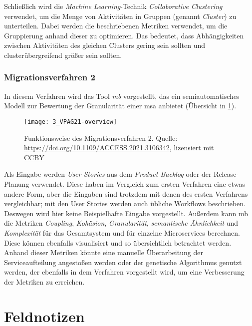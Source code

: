 Schließlich wird die \emph{Machine Learning}-Technik \emph{Collaborative Clustering} verwendet, um die Menge von Aktivitäten in Gruppen (genannt \emph{Cluster}) zu unterteilen.
Dabei werden die beschriebenen Metriken verwendet, um die Gruppierung anhand dieser zu optimieren.
Das bedeutet, dass Abhängigkeiten zwischen Aktivitäten des gleichen Clusters gering sein sollten und clusterübergreifend größer sein sollten.

\subsection{Migrationsverfahren 2}

In diesem Verfahren wird das Tool \emph{\acrfull{mb}} vorgestellt, das ein semiautomatisches Modell zur Bewertung der Granularität einer \gls{msa} anbietet (Übersicht in \cref{fig:interviews-migrationsverfahren2}).

\begin{figure}[!ht]
	\centering
	\texttt{[image: 3\_VPAG21-overview]}
	\caption[Funktionsweise Migrationsverfahren 2]{
		Funktionsweise des Migrationsverfahren 2. Quelle: \url{https://doi.org/10.1109/ACCESS.2021.3106342}, lizensiert mit \hyperref{https://creativecommons.org/licenses/by/4.0/}{}{}{CCBY} 
	}
	\label{fig:interviews-migrationsverfahren2}
\end{figure}

Als Eingabe werden \emph{User Stories} aus dem \emph{Product Backlog} oder der Release-Planung verwendet.
Diese haben im Vergleich zum ersten Verfahren eine etwas andere Form, aber die Eingaben sind trotzdem mit denen des ersten Verfahrens vergleichbar; mit den User Stories werden auch übliche Workflows beschrieben.
Deswegen wird hier keine Beispielhafte Eingabe vorgestellt.
Außerdem kann \gls{mb} die Metriken  \emph{Coupling}, \emph{Kohäsion}, \emph{Granularität}, \emph{semantische Ähnlichkeit} und \emph{Komplexität} für das Gesamtsystem und für einzelne Microservices berechnen. 
Diese können ebenfalls visualisiert und so übersichtlich betrachtet werden.
Anhand dieser Metriken könnte eine manuelle Überarbeitung der Serviceaufteilung angestoßen werden oder der genetische Algorithmus genutzt werden, der ebenfalls in dem Verfahren vorgestellt wird, um eine Verbesserung der Metriken zu erreichen. 

\chapter{Feldnotizen}
\label{chap:field-notes}

